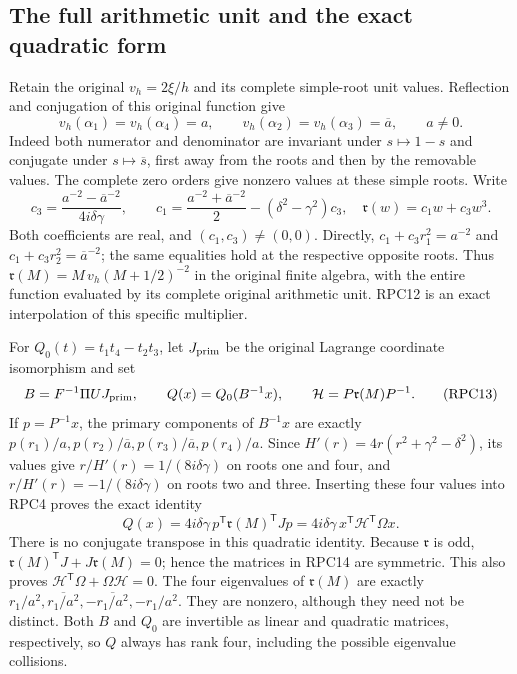 \documentclass[11pt,a4paper]{article}
\begin{document}
\subsection{The full arithmetic unit and the exact quadratic form}

Retain the original $v_h=2\xi/h$ and its complete simple-root unit
values. Reflection and conjugation of this original function give
\[
 v_h(\alpha_1)=v_h(\alpha_4)=a,\qquad
 v_h(\alpha_2)=v_h(\alpha_3)=\overline a,\qquad a\ne0.
 \tag{RPC11}
\]
Indeed both numerator and denominator are invariant under $s\mapsto1-s$
and conjugate under $s\mapsto\overline s$, first away from the roots
and then by the removable values. The complete zero orders give
nonzero values at these simple roots. Write
\[
 c_3=\frac{a^{-2}-\overline a^{-2}}{4i\delta\gamma},\qquad
 c_1=\frac{a^{-2}+\overline a^{-2}}2-(\delta^2-\gamma^2)c_3,
 \quad \mathfrak r(w)=c_1w+c_3w^3.
 \tag{RPC12}
\]
Both coefficients are real, and $(c_1,c_3)\ne(0,0)$. Directly,
$c_1+c_3r_1^2=a^{-2}$ and $c_1+c_3r_2^2=\overline a^{-2}$;
the same equalities hold at the respective opposite roots. Thus
$\mathfrak r(M)=M\,v_h(M+1/2)^{-2}$ in the original finite algebra, with the
entire function evaluated by its complete original arithmetic unit.
RPC12 is an exact interpolation of this specific multiplier.

For $Q_0(t)=t_1t_4-t_2t_3$, let $J_{\rm prim}$ be the original
Lagrange coordinate isomorphism and set
\[
 B=F^{-1}\Pi UJ_{\rm prim},\qquad Q(x)=Q_0(B^{-1}x),\qquad
 \mathcal H=P\mathfrak r(M)P^{-1}.
 \tag{RPC13}
\]
If $p=P^{-1}x$, the primary components of $B^{-1}x$ are exactly
$p(r_1)/a,p(r_2)/\overline a,p(r_3)/\overline a,p(r_4)/a$.
Since $H'(r)=4r(r^2+\gamma^2-\delta^2)$, its values give
$r/H'(r)=1/(8i\delta\gamma)$ on roots one and four, and
$r/H'(r)=-1/(8i\delta\gamma)$ on roots two and three. Inserting
these four values into RPC4 proves the exact identity
\[
 \boxed{\quad Q(x)=4i\delta\gamma\,
       p^{\mathsf T}\mathfrak r(M)^{\mathsf T}Jp
       =4i\delta\gamma\,x^{\mathsf T}\mathcal H^{\mathsf T}\Omega x.\quad}
 \tag{RPC14}
\]
There is no conjugate transpose in this quadratic identity. Because
$\mathfrak r$ is odd, $\mathfrak r(M)^{\mathsf T}J+J\mathfrak r(M)=0$; hence the matrices in
RPC14 are symmetric. This also proves
$\mathcal H^{\mathsf T}\Omega+\Omega\mathcal H=0$.
The four eigenvalues of $\mathfrak r(M)$ are exactly
$r_1/a^2,\overline{r_1/a^2},-\overline{r_1/a^2},-r_1/a^2$.
They are nonzero, although they need not be distinct. Both $B$ and
$Q_0$ are invertible as linear and quadratic matrices, respectively,
so $Q$ always has rank four, including the possible eigenvalue collisions.
\end{document}
